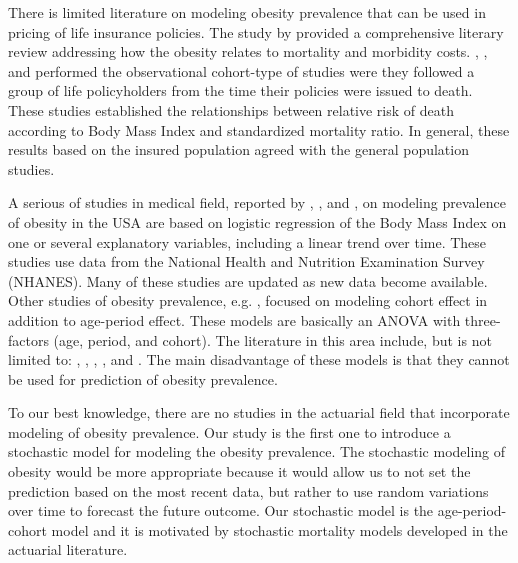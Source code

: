 \documentclass[11pt,letterpaper]{article}
\numberwithin{equation}{section}
\begin{document}
There is limited literature on modeling obesity prevalence that can be used in pricing of life insurance policies. The study by \cite{Behan+Cox+Lin+Pai+Pedersen+Yi:2010} provided a  comprehensive literary review addressing how the obesity relates to mortality and morbidity costs. \cite{Niverthi+Ianovic:2001}, \cite{Baldinger+Schwarz+Jaggy:2006}, and \cite{BradRoudebush+Ashley+Titcomb:2006} performed the observational cohort-type of studies were they followed a group of life policyholders from the time their policies were issued to death. These studies established the relationships between relative risk of death according to Body Mass Index and  standardized mortality ratio. In general, these results based on the insured population agreed with the general population studies.

A serious of studies in medical field, reported by \cite{Ogden+Carroll+Curtin+McDowell+Tabak+Flegal:2006}, \cite{Flegal+Carroll+Ogden+Curtin:2010}, and \cite{Flegal+Carroll+Kit+Ogden:2012}, on modeling prevalence of obesity in the USA are based on logistic regression of the Body Mass Index on one or several explanatory variables, including a linear trend over time. These studies use data from the National Health and Nutrition Examination Survey (NHANES). Many of these studies are updated as new data become available. Other studies of obesity prevalence, e.g. \cite{Keyes+Utz+Robinson+Li:2010}, focused on modeling cohort effect in addition to age-period effect. These models are basically an ANOVA with three-factors (age, period, and cohort). The literature in this area include, but is not limited to: \cite{Rodgers:1982}, \cite{Glenn:2005}, \cite{Yang+Schulhofer-Wohl+Fu+Land:2008}, \cite{Keyes+Utz+Robinson+Li:2010}, and \cite{Mason+Fienberg:2012}. The main disadvantage of these models is that they cannot be used for prediction of obesity prevalence.

To our best knowledge, there are no studies in the actuarial field that incorporate modeling of obesity prevalence. Our study is the first one to introduce a stochastic model for modeling the obesity prevalence. The stochastic modeling of obesity would be more appropriate because it would allow us to not set the prediction based on the most recent data, but rather to use random variations over time to forecast the future outcome. Our stochastic model is the age-period-cohort model and it is motivated by stochastic mortality models developed in the actuarial literature.
\end{document}
